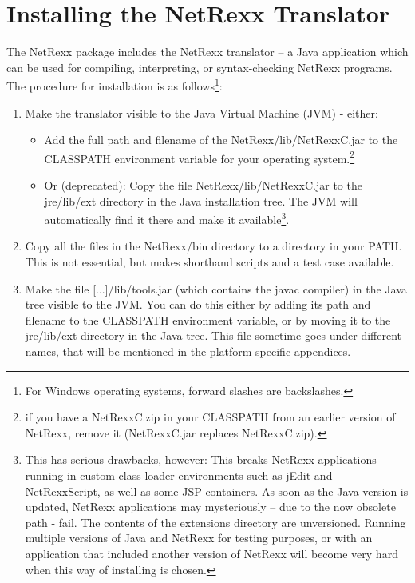 \section{Installing the NetRexx Translator}
The NetRexx package includes the NetRexx translator – a Java application which can be used for compiling, interpreting, or syntax-checking NetRexx programs. The procedure for installation is as follows\footnote{For Windows operating systems, forward slashes are backslashes.}:
\begin{enumerate}
\item Make the translator visible to the Java Virtual Machine (JVM) - either:
\begin{itemize} 
\item Add the full path and filename of the NetRexx/lib/NetRexxC.jar to the CLASSPATH environment variable for your operating system.\footnote{if you have a NetRexxC.zip in your CLASSPATH from an earlier version of NetRexx, remove it (NetRexxC.jar replaces NetRexxC.zip).}
\item Or (deprecated): Copy the file NetRexx/lib/NetRexxC.jar to the jre/lib/ext directory in the Java installation tree. The JVM will automatically find it there and make it available\footnote{ This has serious drawbacks, however:
This breaks NetRexx applications running in custom class loader environments such as jEdit and NetRexxScript, as well as some JSP containers.
As soon as the Java version is updated, NetRexx applications may
mysteriously – due to the now obsolete path - fail. The contents of
the extensions directory are unversioned.
Running multiple versions of Java and NetRexx for testing purposes, or
with an application that included another version of NetRexx will become very hard when this way of installing is chosen.}.
\end{itemize}
\item Copy all the files in the NetRexx/bin directory to a directory in your PATH. This is not essential, but makes shorthand scripts and a test case available. 
\item Make the file [...]/lib/tools.jar (which contains the javac compiler) in the Java tree visible to the JVM. You can do this either by adding its path and filename to the CLASSPATH environment variable, or by moving it to the jre/lib/ext directory in the Java tree. This file sometime goes under different names, that will be mentioned in the platform-specific appendices.
\end{enumerate}
